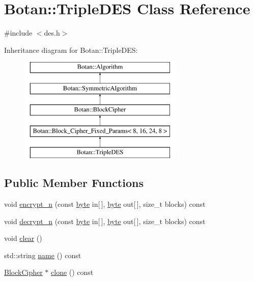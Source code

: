 \hypertarget{classBotan_1_1TripleDES}{\section{Botan\-:\-:Triple\-D\-E\-S Class Reference}
\label{classBotan_1_1TripleDES}
}


{\ttfamily \#include $<$des.\-h$>$}

Inheritance diagram for Botan\-:\-:Triple\-D\-E\-S\-:\begin{figure}[H]
\begin{center}
\leavevmode
\includegraphics[height=5.000000cm]{classBotan_1_1TripleDES}
\end{center}
\end{figure}
\subsection*{Public Member Functions}
\begin{DoxyCompactItemize}
\item 
void \hyperlink{classBotan_1_1TripleDES_a313d371aba08f82a8fa6062f8cf4e294}{encrypt\-\_\-n} (const \hyperlink{namespaceBotan_a7d793989d801281df48c6b19616b8b84}{byte} in\mbox{[}$\,$\mbox{]}, \hyperlink{namespaceBotan_a7d793989d801281df48c6b19616b8b84}{byte} out\mbox{[}$\,$\mbox{]}, size\-\_\-t blocks) const 
\item 
void \hyperlink{classBotan_1_1TripleDES_af7b44d671ceb00c513bf935e817bf074}{decrypt\-\_\-n} (const \hyperlink{namespaceBotan_a7d793989d801281df48c6b19616b8b84}{byte} in\mbox{[}$\,$\mbox{]}, \hyperlink{namespaceBotan_a7d793989d801281df48c6b19616b8b84}{byte} out\mbox{[}$\,$\mbox{]}, size\-\_\-t blocks) const 
\item 
void \hyperlink{classBotan_1_1TripleDES_af4939892ae6fecca7d3616db82a6c175}{clear} ()
\item 
std\-::string \hyperlink{classBotan_1_1TripleDES_a505f6c6c3166da565eb92dc5844c7312}{name} () const 
\item 
\hyperlink{classBotan_1_1BlockCipher}{Block\-Cipher} $\ast$ \hyperlink{classBotan_1_1TripleDES_a4f4825394496f098135cfa6e67d8149b}{clone} () const 
\end{DoxyCompactItemize}
